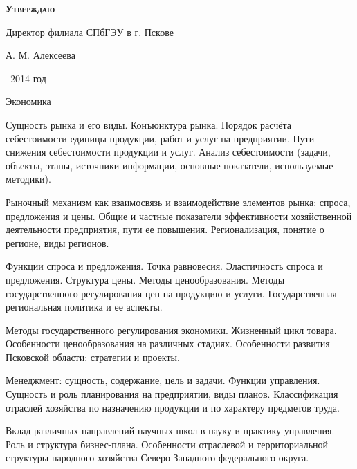 \documentclass[
	11pt,
	a4paper,
	]
	{article}
\begin{document}
\newlength{\pblength}\settowidth{\pblength}{Директор филиала СПбГЭУ в г. Пскове}

\hfill\parbox{\pblength}{
	\textbf{\textsc{Утверждаю}}\medskip

	Директор филиала СПбГЭУ в г. Пскове\medskip

	\makebox[3cm]{\hrulefill} А. М. Алексеева\medskip

	\makebox[1.5cm]{<<\hrulefill>>} \makebox[3cm]{\hrulefill}\ 2014 год
}


 {Экономика}

	

\noindent{} 
	{
		Сущность рынка и его виды. Конъюнктура рынка.
	}{
		Порядок расчёта себестоимости единицы продукции, работ и услуг на предприятии. Пути снижения себестоимости продукции и услуг.
	}{
		Анализ себестоимости (задачи, объекты, этапы, источники информации, основные показатели, используемые методики).
	}

\bigskip

\noindent{} 
	{
		Рыночный механизм как взаимосвязь и взаимодействие элементов рынка: спроса, предложения и цены.
	}{
		Общие и частные показатели эффективности хозяйственной деятельности предприятия, пути ее повышения.
	}{
		Регионализация, понятие о регионе, виды регионов.
	}

\bigskip

\noindent{} 
	{
		Функции спроса и предложения. Точка равновесия. Эластичность спроса и предложения.
	}{
		Структура цены. Методы ценообразования. Методы государственного регулирования цен на продукцию и услуги.
	}{
		Государственная региональная политика и ее аспекты.
	}

\bigskip

\noindent{} 
	{
		Методы государственного регулирования экономики.
	}{
		Жизненный цикл товара. Особенности ценообразования на различных стадиях.
	}{
		Особенности развития Псковской области: стратегии и проекты.
	}

\bigskip

\noindent{} 
	{
		Менеджмент: сущность, содержание, цель и задачи. Функции управления.
	}{
		Сущность и роль планирования на предприятии, виды планов.
	}{
		Классификация отраслей хозяйства по назначению продукции и по характеру предметов труда.
	}

\bigskip

\noindent{} 
	{
		Вклад различных направлений научных школ в науку и практику управления.
	}{
		Роль и структура бизнес-плана.
	}{
		Особенности отраслевой и территориальной структуры народного хозяйства Северо-Западного федерального округа.
	}
\end{document}
